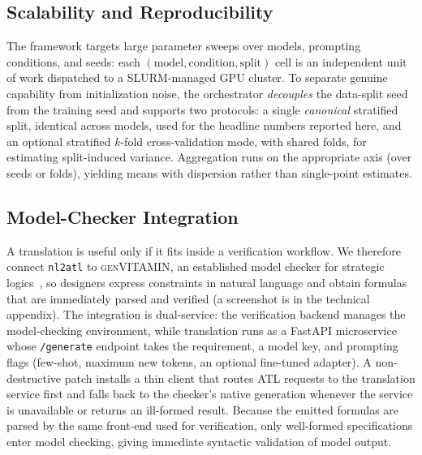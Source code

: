 \subsection{Scalability and Reproducibility}
\label{subsec:scale}
The framework targets large parameter sweeps over models, prompting conditions, and seeds: each $(\text{model}, \text{condition}, \text{split})$ cell is an independent unit of work dispatched to a SLURM-managed GPU cluster. To separate genuine capability from initialization noise, the orchestrator \emph{decouples} the data-split seed from the training seed and supports two protocols: a single \emph{canonical} stratified split, identical across models, used for the headline numbers reported here, and an optional stratified $k$-fold cross-validation mode, with shared folds, for estimating split-induced variance. Aggregation runs on the appropriate axis (over seeds or folds), yielding means with dispersion rather than single-point estimates.

\subsection{Model-Checker Integration}
\label{subsec:integration}
A translation is useful only if it fits inside a verification workflow. We therefore connect \texttt{nl2atl} to \textsc{genVITAMIN}, an established model checker for strategic logics~\cite{DBLP:conf/ifaamas/0001M25}, so designers express constraints in natural language and obtain formulas that are immediately parsed and verified (a screenshot is in the technical appendix). The integration is dual-service: the verification backend manages the model-checking environment, while translation runs as a FastAPI microservice whose \texttt{/generate} endpoint takes the requirement, a model key, and prompting flags (few-shot, maximum new tokens, an optional fine-tuned adapter). A non-destructive patch installs a thin client that routes ATL requests to the translation service first and falls back to the checker's native generation whenever the service is unavailable or returns an ill-formed result. Because the emitted formulas are parsed by the same front-end used for verification, only well-formed specifications enter model checking, giving immediate syntactic validation of model output.